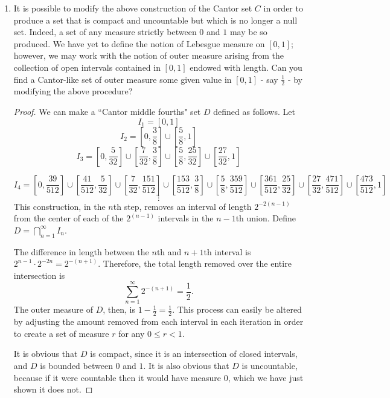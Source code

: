 \documentclass[10pt]{article}
\begin{document}
\begin{enumerate}
\item It is possible to modify the above construction of the Cantor set $C$ in order to produce a set that is compact and uncountable but which is no longer a null set.  Indeed, a set of any measure strictly between $0$ and $1$ may be so produced.  We have yet to define the notion of Lebesgue measure on $[0,1]$; however, we may work with the notion of outer measure arising from the collection of open intervals contained in $[0,1]$ endowed with length.  Can you find a Cantor-like set of outer measure some given value in $[0,1]$ - say $\frac12$ - by modifying the above procedure?

\begin{proof}
We can make a ``Cantor middle fourths" set $D$ defined as follows.  Let
$$
I_1 = \left[ 0 , 1 \right]
$$
$$
 I_2 = \left[0,\frac38 \right] \cup \left[\frac58 , 1\right]
$$ 
$$
 I_3 = \left[0,\frac{5}{32} \right] \cup \left[\frac{7}{32} , \frac38 \right] \cup \left[\frac{5}{8},\frac{25}{32} \right] \cup \left[\frac{27}{32}, 1 \right]
$$

$$
 I_4 = \left[0, \frac{39}{512} \right] \cup \left[\frac{41}{512}, \frac{5}{32} \right] \cup \left[\frac{7}{32} , \frac{151}{512}\right] \cup \left[ \frac{153}{512}, \frac38 \right]
 \cup \left[\frac{5}{8}, \frac{359}{512}\right] \cup \left[ \frac{361}{512}, \frac{25}{32} \right] \cup \left[\frac{27}{32}, \frac{471}{512}\right] \cup \left[\frac{473}{512}, 1 \right]
$$
$$
\vdots
$$
This construction, in the $n$th step, removes an interval of length $2^{-2(n-1)}$ from the center of each of the $2^{(n-1)}$ intervals in the $n-1$th union.  Define $D = \bigcap_{n=1}^\infty I_n$.

The difference in length between the $n$th and $n+1$th interval is $2^{n-1} \cdot 2^{-2n} = 2^{-(n+1)}$.  Therefore, the total length removed over the entire intersection is
$$
\sum_{n=1}^\infty 2^{-(n+1)} = \frac{1}{2}.
$$
The outer measure of $D$, then, is $1 - \frac{1}{2} = \frac12$.  This process can easily be altered by adjusting the amount removed from each interval in each iteration in order to create a set of measure $r$ for any $0 \leq r < 1$.

It is obvious that $D$ is compact, since it is an intersection of closed intervals, and $D$ is bounded between $0$ and $1$.  It is also obvious that $D$ is uncountable, because if it were countable then it would have measure $0$, which we have just shown it does not.
\end{proof}

\end{enumerate}
\end{document}
